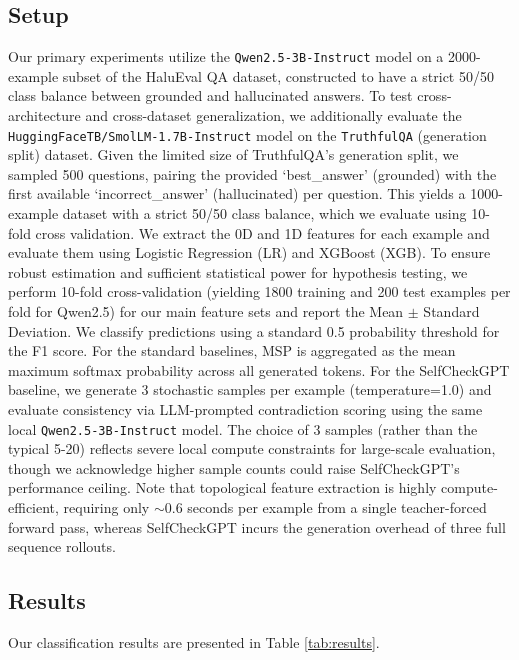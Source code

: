 \documentclass[11pt,a4paper]{article}
\begin{document}
\subsection{Setup}
Our primary experiments utilize the \texttt{Qwen2.5-3B-Instruct} model on a 2000-example subset of the HaluEval QA dataset, constructed to have a strict 50/50 class balance between grounded and hallucinated answers. To test cross-architecture and cross-dataset generalization, we additionally evaluate the \texttt{HuggingFaceTB/SmolLM-1.7B-Instruct} model on the \texttt{TruthfulQA} (generation split) dataset. Given the limited size of TruthfulQA's generation split, we sampled 500 questions, pairing the provided `best\_answer' (grounded) with the first available `incorrect\_answer' (hallucinated) per question. This yields a 1000-example dataset with a strict 50/50 class balance, which we evaluate using 10-fold cross validation. We extract the 0D and 1D features for each example and evaluate them using Logistic Regression (LR) and XGBoost (XGB). To ensure robust estimation and sufficient statistical power for hypothesis testing, we perform 10-fold cross-validation (yielding 1800 training and 200 test examples per fold for Qwen2.5) for our main feature sets and report the Mean $\pm$ Standard Deviation. We classify predictions using a standard 0.5 probability threshold for the F1 score. For the standard baselines, MSP is aggregated as the mean maximum softmax probability across all generated tokens. For the SelfCheckGPT baseline, we generate 3 stochastic samples per example (temperature=1.0) and evaluate consistency via LLM-prompted contradiction scoring using the same local \texttt{Qwen2.5-3B-Instruct} model. The choice of 3 samples (rather than the typical 5-20) reflects severe local compute constraints for large-scale evaluation, though we acknowledge higher sample counts could raise SelfCheckGPT's performance ceiling. Note that topological feature extraction is highly compute-efficient, requiring only $\sim 0.6$ seconds per example from a single teacher-forced forward pass, whereas SelfCheckGPT incurs the generation overhead of three full sequence rollouts.

\subsection{Results}
Our classification results are presented in Table \ref{tab:results}.
\end{document}
